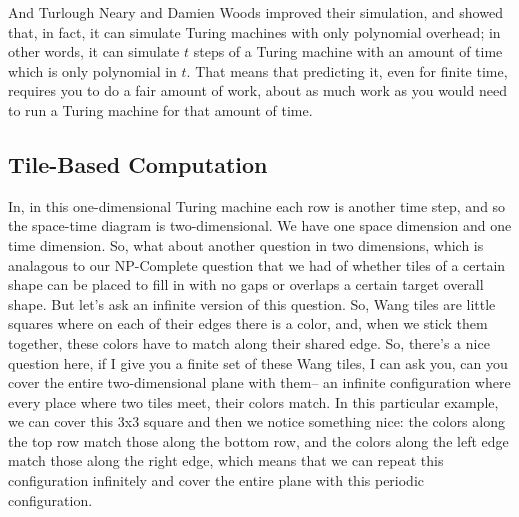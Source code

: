 \documentclass[]{article}
\begin{document}
And Turlough Neary and Damien Woods improved their simulation, and showed that, in fact, it can simulate Turing machines with only polynomial overhead\cite{neary2009small}; in other words, it can simulate $t$ steps of a Turing machine with an amount of time which is only polynomial in $t$. That means that predicting it, even for finite time, requires you to do a fair amount of work, about as much work as you would need to run a Turing machine for that amount of time.

\subsection{Tile-Based Computation}

In, in this one-dimensional Turing machine
each row is another time step,
and so the space-time diagram
is two-dimensional.
We have one space dimension
and one time dimension.
So, what about another question
in two dimensions,
which is analagous
to our NP-Complete question
that we had of whether
tiles of a certain shape
can be placed
to fill in with no gaps or overlaps
a certain target overall shape.
But let's ask an infinite version
of this question.
So, Wang tiles
are little squares
where on each of their edges
there is a color,
and, when we stick them together,
these colors have to match
along their shared edge.
So, there's a nice question here,
if I give you
a finite set of these Wang tiles,
I can ask you,
can you cover the entire
two-dimensional plane with them--
an infinite configuration
where every place where two tiles meet,
their colors match.
In this particular example,
we can cover this 3x3 square
and then we notice something nice:
the colors along the top row
match those along the bottom row,
and the colors along the left edge
match those along the right edge,
which means that we can repeat
this configuration infinitely
and cover the entire plane
with this periodic configuration.
\end{document}
